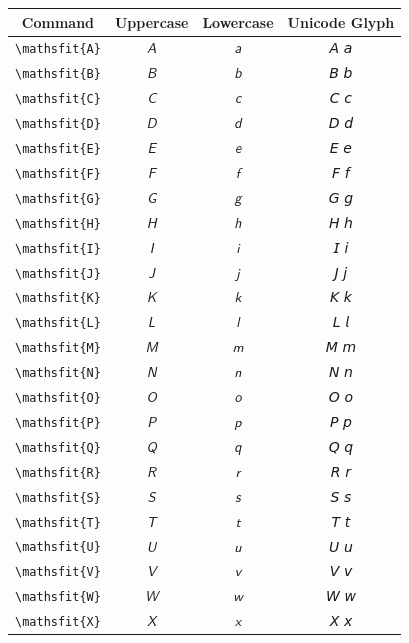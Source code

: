 \documentclass[12pt,a4paper]{article}
\begin{document}
\begin{longtable}{|c|c|c|c|}
\hline
\textbf{Command} & \textbf{Uppercase} & \textbf{Lowercase} & \textbf{Unicode Glyph} \\
\hline
\verb|\mathsfit{A}| & $\mathsfit{A}$ & $\mathsfit{a}$ & 𝘈 𝘢 \\
\verb|\mathsfit{B}| & $\mathsfit{B}$ & $\mathsfit{b}$ & 𝘉 𝘣 \\
\verb|\mathsfit{C}| & $\mathsfit{C}$ & $\mathsfit{c}$ & 𝘊 𝘤 \\
\verb|\mathsfit{D}| & $\mathsfit{D}$ & $\mathsfit{d}$ & 𝘋 𝘥 \\
\verb|\mathsfit{E}| & $\mathsfit{E}$ & $\mathsfit{e}$ & 𝘌 𝘦 \\
\verb|\mathsfit{F}| & $\mathsfit{F}$ & $\mathsfit{f}$ & 𝘍 𝘧 \\
\verb|\mathsfit{G}| & $\mathsfit{G}$ & $\mathsfit{g}$ & 𝘎 𝘨 \\
\verb|\mathsfit{H}| & $\mathsfit{H}$ & $\mathsfit{h}$ & 𝘏 𝘩 \\
\verb|\mathsfit{I}| & $\mathsfit{I}$ & $\mathsfit{i}$ & 𝘐 𝘪 \\
\verb|\mathsfit{J}| & $\mathsfit{J}$ & $\mathsfit{j}$ & 𝘑 𝘫 \\
\verb|\mathsfit{K}| & $\mathsfit{K}$ & $\mathsfit{k}$ & 𝘒 𝘬 \\
\verb|\mathsfit{L}| & $\mathsfit{L}$ & $\mathsfit{l}$ & 𝘓 𝘭 \\
\verb|\mathsfit{M}| & $\mathsfit{M}$ & $\mathsfit{m}$ & 𝘔 𝘮 \\
\verb|\mathsfit{N}| & $\mathsfit{N}$ & $\mathsfit{n}$ & 𝘕 𝘯 \\
\verb|\mathsfit{O}| & $\mathsfit{O}$ & $\mathsfit{o}$ & 𝘖 𝘰 \\
\verb|\mathsfit{P}| & $\mathsfit{P}$ & $\mathsfit{p}$ & 𝘗 𝘱 \\
\verb|\mathsfit{Q}| & $\mathsfit{Q}$ & $\mathsfit{q}$ & 𝘘 𝘲 \\
\verb|\mathsfit{R}| & $\mathsfit{R}$ & $\mathsfit{r}$ & 𝘙 𝘳 \\
\verb|\mathsfit{S}| & $\mathsfit{S}$ & $\mathsfit{s}$ & 𝘚 𝘴 \\
\verb|\mathsfit{T}| & $\mathsfit{T}$ & $\mathsfit{t}$ & 𝘛 𝘵 \\
\verb|\mathsfit{U}| & $\mathsfit{U}$ & $\mathsfit{u}$ & 𝘜 𝘶 \\
\verb|\mathsfit{V}| & $\mathsfit{V}$ & $\mathsfit{v}$ & 𝘝 𝘷 \\
\verb|\mathsfit{W}| & $\mathsfit{W}$ & $\mathsfit{w}$ & 𝘞 𝘸 \\
\verb|\mathsfit{X}| & $\mathsfit{X}$ & $\mathsfit{x}$ & 𝘟 𝘹 \\

\end{longtable}
\end{document}
